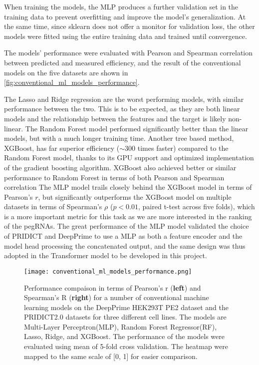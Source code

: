 When training the models, the MLP produces a further validation set in the training data to prevent overfitting and improve the model's generalization. At the same time, since sklearn does not offer a monitor for validation loss, the other models were fitted using the entire training data and trained until convergence.

The models' performance were evaluated with Pearson and Spearman correlation between predicted and measured efficiency, and the result of the conventional models on the five datasets are shown in \autoref{fig:conventional_ml_models_performance}. 

The Lasso and Ridge regression are the worst performing models, with similar performance between the two. This is to be expected, as they are both linear models and the relationship between the features and the target is likely non-linear. The Random Forest model performed significantly better than the linear models, but with a much longer training time. Another tree based method, XGBoost, has far superior efficiency ($\sim$300 times faster) compared to the Random Forest model, thanks to its GPU support and optimized implementation of the gradient boosting algorithm. XGBoost also achieved better or similar performance to Random Forest in terms of both Pearson and Spearman correlation The MLP model trails closely behind the XGBoost model in terms of Pearson's $r$, but significantly outperforms the XGBoost model on multiple datasets in terms of Spearman's $\rho$ ($p<0.01$, paired t-test across five folds), which is a more important metric for this task as we are more interested in the ranking of the pegRNAs. The great performance of the MLP model validated the choice of PRIDICT and DeepPrime to use a MLP as both a feature encoder and the model head processing the concatenated output, and the same design was thus adopted in the Transformer model to be developed in this project.

\begin{figure}
    \centering
    \texttt{[image: conventional\_ml\_models\_performance.png]}
    \caption[Conventional ML model performance comparison]{Performance compaison in terms of Pearson's r (\textbf{left}) and Spearman's R (\textbf{right}) for a number of conventional machine learning models on the DeepPrime HEK293T PE2 dataset and the PRIDICT2.0 datasets for three different cell lines. The models are Multi-Layer Perceptron(MLP), Random Forest Regressor(RF), Lasso, Ridge, and XGBoost. The performance of the models were evaluated using mean of 5-fold cross validation. The heatmap were mapped to the same scale of [0, 1] for easier comparison.}
    \label{fig:conventional_ml_models_performance}
\end{figure}


